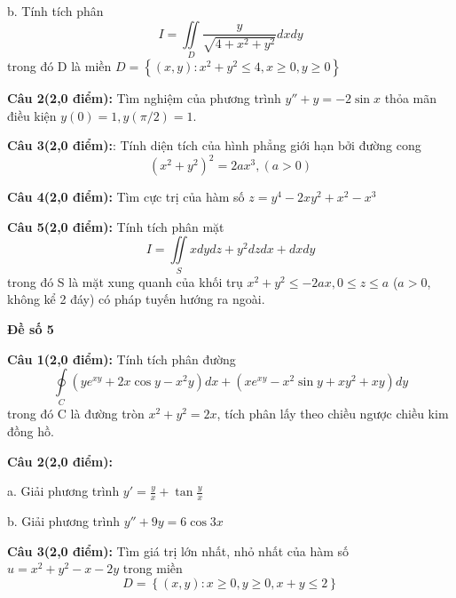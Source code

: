 \documentclass[14pt, a4paper]{article}
\begin{document}
	b. Tính tích phân\[I = \iint\limits_D {\frac{y}{{\sqrt {4 + {x^2} + {y^2}} }}dxdy}\] trong đó D là miền $ D = \left\{ {(x,y):{x^2} + {y^2} \leqslant 4,x \geqslant 0,y \geqslant 0} \right\} $
	
	\vspace{0.5cm}
	
	\textbf{Câu 2(2,0 điểm):} Tìm nghiệm của phương trình $ y'' + y =  - 2\sin x $ thỏa mãn điều kiện $ y(0)=1, y(\pi/2)=1 $.
	
	\vspace{0.5cm}
	
	\textbf{Câu 3(2,0 điểm):}: Tính diện tích của hình phẳng giới hạn bởi đường cong \[{({x^2} + {y^2})^2} = 2a{x^3},(a > 0)\]
	
	\vspace{0.5cm}
	
	\textbf{Câu 4(2,0 điểm):} Tìm cực trị của hàm số $ z = {y^4} - 2x{y^2} + {x^2} - {x^3} $
	
	\vspace{0.5cm}
	
	\textbf{Câu 5(2,0 điểm):} Tính tích phân mặt \[I = \iint\limits_S {xdydz + {y^2}dzdx + dxdy}\] trong đó S là mặt xung quanh của khối trụ $ {x^2} + {y^2} \leqslant  - 2ax,0 \leqslant z \leqslant a $ ($ a > 0 $, không kể 2 đáy) có pháp tuyến hướng ra ngoài.
	
	\pagebreak
	
	\begin{center}
		{\large \textbf{Đề số 5}}
	\end{center}
	
	\textbf{Câu 1(2,0 điểm):} Tính tích phân đường \[\oint\limits_C {(y{e^{xy}} + 2x\cos y - {x^2}y)dx + (x{e^{xy}} - {x^2}\sin y + x{y^2} + xy)dy} \] trong đó C là đường tròn $ {x^2} + {y^2} = 2x $, tích phân lấy theo chiều ngược chiều kim đồng hồ.
	
	\vspace{0.5cm}
	
	\textbf{Câu 2(2,0 điểm):}
	
	a. Giải phương trình $ y' = \frac{y}{x} + \tan \frac{y}{x} $
	
	b. Giải phương trình $ y'' + 9y = 6\cos 3x $
	
	\vspace{0.5cm}
	
	\textbf{Câu 3(2,0 điểm):} Tìm giá trị lớn nhất, nhỏ nhất của hàm số $ u = {x^2} + {y^2} - x - 2y $ trong miền \[D = \left\{ {(x,y):x \geqslant 0,y \geqslant 0,x + y \leqslant 2} \right\}\]
	
\end{document}
